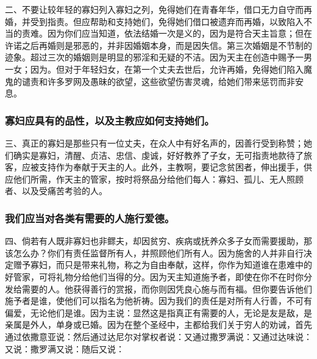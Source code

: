 二、不要让较年轻的寡妇列入寡妇之列，免得她们在青春年华，借口无力自守而再婚，并受到指责。但应帮助和支持她们，免得她们借口被遗弃而再婚，以致陷入不当的责难。因为你们应当知道，依法结婚一次是义的，因为是符合天主旨意；但在许诺之后再婚则是邪恶的，并非因婚姻本身，而是因失信。第三次婚姻是不节制的迹象。超过三次的婚姻则是明显的邪淫和无疑的不洁。因为天主在创造中赐予一男一女；因为。但对于年轻妇女，在第一个丈夫去世后，允许再婚，免得她们陷入魔鬼的谴责和许多罗网及愚昧的欲望，这些欲望伤害灵魂，给她们带来惩罚而非安息。\par


\subsubsection{寡妇应具有的品性，以及主教应如何支持她们。}

三、真正的寡妇是那些只有一位丈夫，在众人中有好名声的，因善行受到称赞；她们确实是寡妇，清醒、贞洁、忠信、虔诚，好好教养了子女，无可指责地款待了旅客，应被支持作为奉献于天主的人。此外，主教啊，要记念贫困者，伸出援手，供应他们所需，作天主的管家，按时将祭品分给他们每人：寡妇、孤儿、无人照顾者、以及受痛苦考验的人。\par


\subsubsection{我们应当对各类有需要的人施行爱德。}

四、倘若有人既非寡妇也非鳏夫，却因贫穷、疾病或抚养众多子女而需要援助，那该怎么办？你们有责任监督所有人，并照顾他们所有人。因为施舍的人并非自行决定赠予寡妇，而只是带来礼物，称之为自由奉献，这样，你作为知道谁在患难中的好管家，可将礼物分给他们当得的分。因为天主知道施予者，即使在你不在时你分发给需要的人。他获得善行的赏报，而你则因凭良心施与而有福。但你要告诉他们施予者是谁，使他们可以指名为他祈祷。因为我们的责任是对所有人行善，不可有偏爱，无论他们是谁。因为主说：显然这是指真正有需要的人，无论是友是敌，是亲属是外人，单身或已婚。因为在整个圣经中，主都给我们关于穷人的劝诫，首先通过依撒意亚说：然后通过达尼尔对掌权者说：又通过撒罗满说：又通过达味说：又说：撒罗满又说：随后又说：\par

